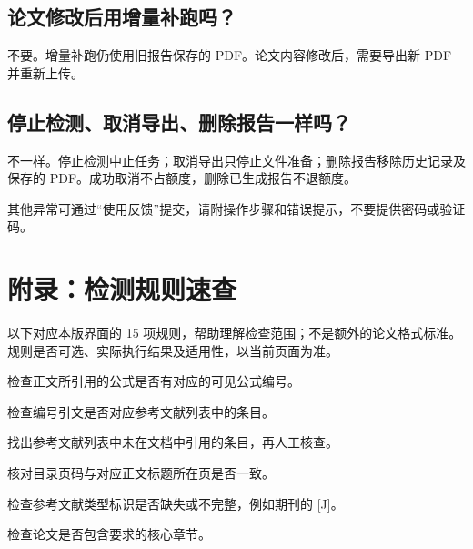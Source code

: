 \documentclass[12pt,a4paper]{article}
\newcommand{\note}[1]{\par\medskip\noindent\begingroup\setlength{\fboxsep}{9pt}\colorbox{pale}{\parbox{\dimexpr\linewidth-18pt\relax}{#1}}\endgroup\par}
\begin{document}
\Needspace{32mm}\subsection*{论文修改后用增量补跑吗？}不要。增量补跑仍使用旧报告保存的 PDF。论文内容修改后，需要导出新 PDF 并重新上传。\par
\Needspace{32mm}\subsection*{停止检测、取消导出、删除报告一样吗？}不一样。停止检测中止任务；取消导出只停止文件准备；删除报告移除历史记录及保存的 PDF。成功取消不占额度，删除已生成报告不退额度。\par
\note{其他异常可通过“使用反馈”提交，请附操作步骤和错误提示，不要提供密码或验证码。}
\clearpage\section*{附录：检测规则速查}\label{zh:rules}
以下对应本版界面的 15 项规则，帮助理解检查范围；不是额外的论文格式标准。规则是否可选、实际执行结果及适用性，以当前页面为准。
\Needspace{26mm}\par{}\par 检查正文所引用的公式是否有对应的可见公式编号。\par
\Needspace{26mm}\par{}\par 检查编号引文是否对应参考文献列表中的条目。\par
\Needspace{26mm}\par{}\par 找出参考文献列表中未在文档中引用的条目，再人工核查。\par
\Needspace{26mm}\par{}\par 核对目录页码与对应正文标题所在页是否一致。\par
\Needspace{26mm}\par{}\par 检查参考文献类型标识是否缺失或不完整，例如期刊的 [J]。\par
\Needspace{26mm}\par{}\par 检查论文是否包含要求的核心章节。\par
\end{document}
